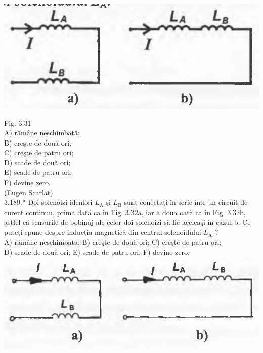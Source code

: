 \documentclass[10pt]{article}
\begin{document}
\includegraphics[max width=\textwidth, center]{2025_07_01_5b3ff9fa0d508c8e9f17g-187}

Fig. 3.31\\
A) rămâne neschimbată;\\
B) creşte de două ori;\\
C) creşte de patru ori;\\
D) scade de două ori;\\
E) scade de patru ori;\\
F) devine zero.\\
(Eugen Scarlat)\\
3.189.* Doi solenoizi identici $L_{\mathrm{A}}$ şi $L_{\mathrm{B}}$ sunt conectați în serie într-un circuit de curent continuu, prima dată ca în Fig. 3.32a, iar a doua oară ca în Fig. 3.32b, astfel că sensurile de bobinaj ale celor doi solenoizi să fie aceleaşi în cazul b. Ce puteți spune despre inducția magnetică din centrul solenoidului $L_{\mathrm{A}}$ ?\\
A) rămâne neschimbată; B) creşte de două ori; C) creşte de patru ori;\\
D) scade de două ori; E) scade de patru ori; F) devine zero.\\
\includegraphics[max width=\textwidth, center]{2025_07_01_5b3ff9fa0d508c8e9f17g-187(1)}
\end{document}
